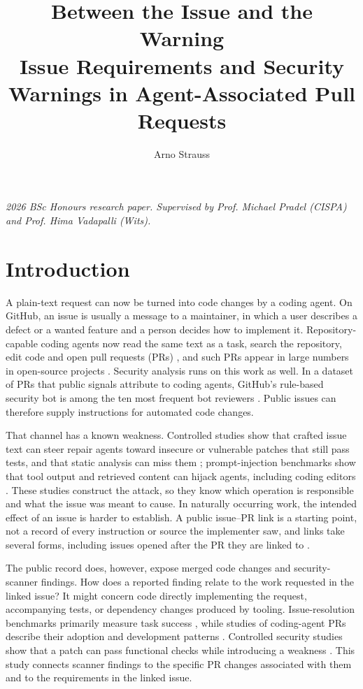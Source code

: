 \documentclass[acmsmall,screen,nonacm]{acmart}
\title[Between the Issue and the Warning]{Between the Issue and the Warning\texorpdfstring{\\[0.25em]}{ }Issue Requirements and Security Warnings in Agent-Associated Pull Requests}
\author{Arno Strauss}
\affiliation{\institution{School of Computer Science and Applied Mathematics, University of the Witwatersrand}\city{Johannesburg}\country{South Africa}}
\begin{document}
\maketitle
\raggedbottom
\noindent\textit{2026 BSc Honours research paper. Supervised by Prof. Michael Pradel (CISPA) and Prof. Hima Vadapalli (Wits).}

\section{Introduction}

A plain-text request can now be turned into code changes by a coding agent. On GitHub, an issue is usually a message to a maintainer, in which a user describes a defect or a wanted feature and a person decides how to implement it. Repository-capable coding agents now read the same text as a task, search the repository, edit code and open pull requests (PRs) \cite{b9,b20,b22,b25}, and such PRs appear in large numbers in open-source projects \cite{b11,b21}. Security analysis runs on this work as well. In a dataset of PRs that public signals attribute to coding agents, GitHub's rule-based security bot is among the ten most frequent bot reviewers \cite{b11}. Public issues can therefore supply instructions for automated code changes.

That channel has a known weakness. Controlled studies show that crafted issue text can steer repair agents toward insecure or vulnerable patches that still pass tests, and that static analysis can miss them \cite{b3,b16}; prompt-injection benchmarks show that tool output and retrieved content can hijack agents, including coding editors \cite{b6,b12,b24}. These studies construct the attack, so they know which operation is responsible and what the issue was meant to cause. In naturally occurring work, the intended effect of an issue is harder to establish. A public issue--PR link is a starting point, not a record of every instruction or source the implementer saw, and links take several forms, including issues opened after the PR they are linked to \cite{b5}.

The public record does, however, expose merged code changes and security-scanner findings. How does a reported finding relate to the work requested in the linked issue? It might concern code directly implementing the request, accompanying tests, or dependency changes produced by tooling. Issue-resolution benchmarks primarily measure task success \cite{b9}, while studies of coding-agent PRs describe their adoption and development patterns \cite{b11,b21}. Controlled security studies show that a patch can pass functional checks while introducing a weakness \cite{b3,b35}. This study connects scanner findings to the specific PR changes associated with them and to the requirements in the linked issue.
\end{document}
